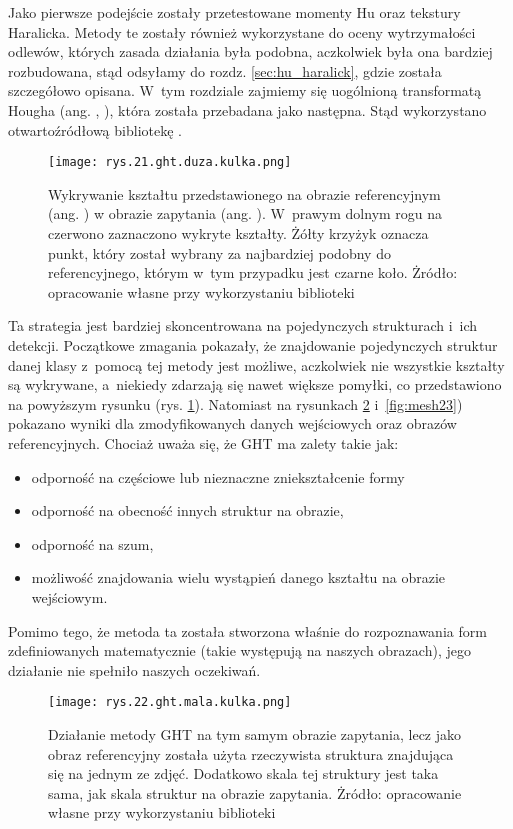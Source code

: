 Jako pierwsze podejście zostały przetestowane momenty Hu oraz tekstury Haralicka. Metody te zostały również wykorzystane do oceny wytrzymałości odlewów, których zasada działania była podobna, aczkolwiek była ona bardziej rozbudowana, stąd odsyłamy do rozdz. \ref{sec:hu_haralick}, gdzie została szczegółowo opisana. W~tym rozdziale zajmiemy się uogólnioną transformatą Hougha (ang. , ), która została przebadana jako następna. Stąd wykorzystano otwartoźródłową bibliotekę  \cite{generalhough}.
\begin{figure}[h]
    \centering
    \texttt{[image: rys.21.ght.duza.kulka.png]}
    \caption{Wykrywanie kształtu przedstawionego na obrazie referencyjnym (ang. ) w obrazie zapytania (ang. ). W~prawym dolnym rogu na czerwono zaznaczono wykryte kształty. Żółty krzyżyk oznacza punkt, który został wybrany za najbardziej podobny do referencyjnego, którym w~tym przypadku jest czarne koło. Żródło: opracowanie własne przy wykorzystaniu biblioteki }
    \label{fig:mesh21}
\end{figure}
Ta strategia jest bardziej skoncentrowana na pojedynczych strukturach i~ich detekcji. Początkowe zmagania pokazały, że znajdowanie pojedynczych struktur danej klasy z~pomocą tej metody jest możliwe, aczkolwiek nie wszystkie kształty są wykrywane, a~niekiedy zdarzają się nawet większe pomyłki, co przedstawiono na powyższym rysunku (rys. \ref{fig:mesh21}). Natomiast na rysunkach \ref{fig:mesh22} i~\ref{fig:mesh23}) pokazano wyniki dla zmodyfikowanych danych wejściowych oraz obrazów referencyjnych. Chociaż uważa się, że GHT ma zalety takie jak:
\begin{itemize}
	\item odporność na częściowe lub nieznaczne zniekształcenie formy
	\item odporność na obecność innych struktur na obrazie,
	\item odporność na szum,
	\item możliwość znajdowania wielu wystąpień danego kształtu na obrazie wejściowym.
\end{itemize}
Pomimo tego, że metoda ta została stworzona właśnie do rozpoznawania form zdefiniowanych matematycznie (takie występują na naszych obrazach), jego działanie nie spełniło naszych oczekiwań.
\begin{figure}[h]
    \centering
    \texttt{[image: rys.22.ght.mala.kulka.png]}
    \caption{Działanie metody GHT na tym samym obrazie zapytania, lecz jako obraz referencyjny została użyta rzeczywista struktura znajdująca się na jednym ze zdjęć. Dodatkowo skala tej struktury jest taka sama, jak skala struktur na obrazie zapytania. Żródło: opracowanie własne przy wykorzystaniu biblioteki }
    \label{fig:mesh22}
\end{figure}
